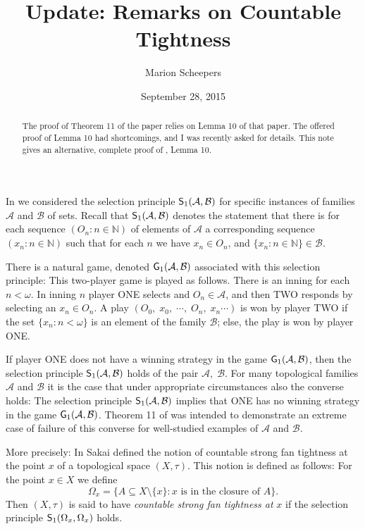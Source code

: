 \documentclass{amsart}
\title{Update: Remarks on Countable Tightness}
\author{Marion Scheepers}
\date{September 28, 2015} %
\newcommand{\naturals}{{\mathbb N}}
\newcommand{\sone}{{\sf S}_1}
\newcommand{\gone}{{\sf G}_1}
\begin{document}
\begin{abstract}
The proof of Theorem 11 of the paper \cite{RCT} relies on Lemma 10 of that paper. The offered proof of Lemma 10 had shortcomings, and I was recently asked for details. This note gives an alternative, complete proof of \cite{RCT}, Lemma 10. 
\end{abstract}
\maketitle

In \cite{RCT} we considered the selection principle $\sone(\mathcal{A},\mathcal{B})$ for specific instances of families $\mathcal{A}$ and $\mathcal{B}$ of sets. Recall that $\sone(\mathcal{A},\mathcal{B})$ denotes the statement that there is for each sequence $(O_n:n\in\naturals)$ of elements of $\mathcal{A}$ a corresponding sequence $(x_n:n\in\naturals)$ such that for each $n$ we have $x_n\in O_n$, and $\{x_n:n\in\naturals\}\in\mathcal{B}$.

There is a natural game, denoted $\gone(\mathcal{A},\mathcal{B})$ associated with this selection principle: This two-player game is played as follows. There is an inning for each $n<\omega$. In inning $n$ player ONE selects and $O_n\in\mathcal{A}$, and then TWO responds by selecting an $x_n\in O_n$. A play $(O_0,\; x_0,\; \cdots,\; O_n,\; x_n\cdots)$ is won by player TWO if the set $\{x_n:n<\omega\}$ is an element of the family $\mathcal{B}$; else, the play is won by player ONE.

If player ONE does not have a winning strategy in the game $\gone(\mathcal{A},\mathcal{B})$, then the selection principle $\sone(\mathcal{A},\mathcal{B})$ holds of the pair $\mathcal{A},\; \mathcal{B}$. For many topological families $\mathcal{A}$ and $\mathcal{B}$ it is the case that under appropriate circumstances also the converse holds: 
The selection principle $\sone(\mathcal{A},\mathcal{B})$ implies that ONE has no winning strategy in the game $\gone(\mathcal{A},\mathcal{B})$. Theorem 11 of \cite{RCT} was intended to demonstrate an extreme case of failure of this converse for well-studied examples of $\mathcal{A}$ and $\mathcal{B}$. 

More precisely: In \cite{Sakai} Sakai defined the notion of countable strong fan tightness at the point $x$ of a topological space $(X,\tau)$. This notion is defined as follows: For the point $x\in X$ we define
\[
  \Omega_x = \{A\subseteq X\setminus \{x\}: x \mbox{ is in the closure of }A\}.
\]
Then $(X,\tau)$ is said to have \emph{countable strong fan tightness at} $x$ if the selection principle $\sone(\Omega_x,\Omega_x)$ holds. 
\end{document}
